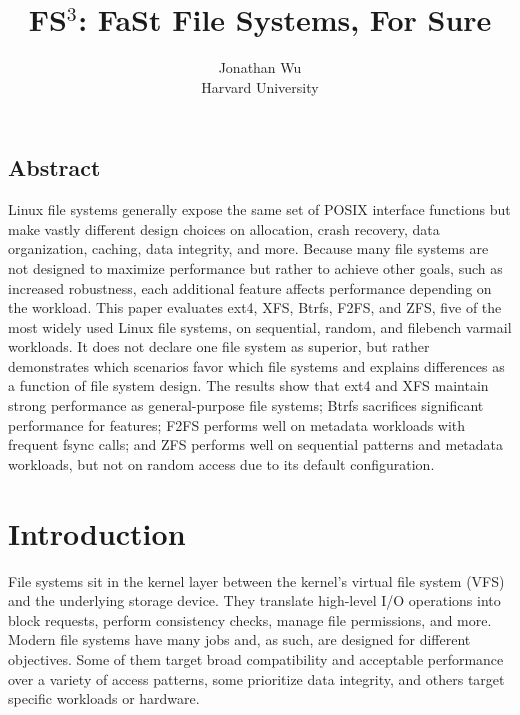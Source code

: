 \documentclass[letterpaper,twocolumn,10pt]{article}
\begin{document}
\date{}

\title{\Large \bf FS$^3$: FaSt File Systems, For Sure}

\author{
{\rm Jonathan Wu}\\
Harvard University
}

\maketitle

\thispagestyle{empty}


\subsection*{Abstract}
Linux file systems generally expose the same set of POSIX interface functions but make vastly different design choices on allocation, crash recovery, data organization, caching, data integrity, and more. Because many file systems are not designed to maximize performance but rather to achieve other goals, such as increased robustness, each additional feature affects performance depending on the workload. This paper evaluates ext4, XFS, Btrfs, F2FS, and ZFS, five of the most widely used Linux file systems, on sequential, random, and filebench varmail workloads. It does not declare one file system as superior, but rather demonstrates which scenarios favor which file systems and explains differences as a function of file system design. The results show that ext4 and XFS maintain strong performance as general-purpose file systems; Btrfs sacrifices significant performance for features; F2FS performs well on metadata workloads with frequent fsync calls; and ZFS performs well on sequential patterns and metadata workloads, but not on random access due to its default configuration.

\section{Introduction}

File systems sit in the kernel layer between the kernel's virtual file system (VFS) and the underlying storage device. They translate high-level I/O operations into block requests, perform consistency checks, manage file permissions, and more. Modern file systems have many jobs and, as such, are designed for different objectives. Some of them target broad compatibility and acceptable performance over a variety of access patterns, some prioritize data integrity, and others target specific workloads or hardware.
\end{document}
